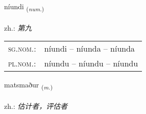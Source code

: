 \documentclass[frontgrid, backgrid]{flacards}\usepackage[]{graphicx}\usepackage[]{xcolor}
\begin{document}
\renewcommand{\flhead}{\vskip5pt \fboxsep=0pt {\small\bfseries\footnotesize Töluorð | 数量词}}
\renewcommand{\fcfoot}{\vskip5pt \fboxsep=0pt \hspace{2pt}{\small\bfseries\footnotesize 3K}}

\renewcommand{\blhead}{\vskip5pt {\small\bfseries\footnotesize Töluorð | 数量词 }}
\renewcommand{\bcfoot}{\vskip5pt \hspace{2pt}{\small\bfseries\footnotesize 3K}}


{níundi \small{\textsubscript{(\textit{num.})}} \\[1ex] %
\textphonetic{[nijʏntɪ]} \\
zh.: \emph{第九} \\  [2ex]
\renewcommand*{\arraystretch}{0.8}
\begin{tabular}{ll}
\textsc{sg.nom.}: & níundi  --  níunda -- níunda \\ 
\textsc{pl.nom.}: & níundu -- níundu -- níundu
\end{tabular}
}

\renewcommand{\flhead}{\vskip5pt \fboxsep=0pt {\small\bfseries\footnotesize Nafnorð | 名词}}
\renewcommand{\fcfoot}{\vskip5pt \fboxsep=0pt \hspace{2pt}{\small\bfseries\footnotesize 3K}}

\renewcommand{\blhead}{\vskip5pt {\small\bfseries\footnotesize Nafnorð | 名词 }}
\renewcommand{\bcfoot}{\vskip5pt \hspace{2pt}{\small\bfseries\footnotesize 3K}}


{matsmaður \small{\textsubscript{(\textit{m.})}} \\[1ex] %
\textphonetic{[maːtsmaðʏr]} \\
zh.: \emph{估计者，评估者} \\  [2ex]
\renewcommand*{\arraystretch}{0.8}
}
\end{document}
